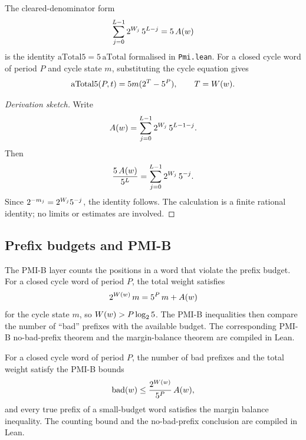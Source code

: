 The cleared-denominator form
\begin{equation*}
  \sum_{j=0}^{L-1} 2^{W_j}\,5^{L-j}
    =5\,A(w)
\end{equation*}
is the identity \(\mathrm{aTotal5}=5\,\mathrm{aTotal}\) formalised in
\texttt{Pmi.lean}.  For a closed cycle word of period $P$ and cycle
state $m$, substituting the cycle equation gives
\begin{equation*}
  \mathrm{aTotal5}(P,t)=5m(2^T-5^P),
\qquad T=W(w).
\end{equation*}

\begin{proof}[Derivation sketch]
Write
\begin{equation*}
  A(w)=\sum_{j=0}^{L-1}
    2^{W_j}\,5^{L-1-j}.
\end{equation*}
Then
\begin{equation*}
  \frac{5\,A(w)}{5^L}
    =\sum_{j=0}^{L-1}2^{W_j}\,5^{-j}.
\end{equation*}
Since $2^{-m_j}=2^{W_j}5^{-j}$, the identity follows.  The
calculation is a finite rational identity; no limits or estimates are
involved.
\end{proof}

\subsection{Prefix budgets and PMI-B}

The PMI-B layer counts the positions in a word that violate the prefix
budget.  For a closed cycle word of period $P$, the total weight
satisfies
\begin{equation*}
  2^{W(w)}\,m=5^P\,m+A(w)
\end{equation*}
for the cycle state $m$, so $W(w)>P\log_2 5$.  The PMI-B
inequalities then compare the number of ``bad'' prefixes with the
available budget.  The corresponding PMI-B no-bad-prefix theorem and
the margin-balance theorem are compiled in Lean.

\begin{lemma}\label{lem:pmi-b-count}
For a closed cycle word of period $P$, the number of bad prefixes and
the total weight satisfy the PMI-B bounds
\begin{equation*}
  \operatorname{bad}(w)\le
  \frac{2^{W(w)}}{5^P}\,A(w),
\end{equation*}
and every true prefix of a small-budget word satisfies the margin
balance inequality.  The counting bound and the no-bad-prefix
conclusion are compiled in Lean.
\end{lemma}

